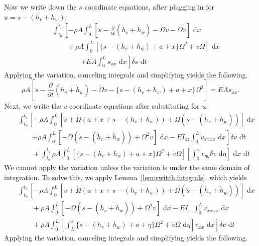 Now we write down the $s$ coordinate equations, after plugging in for $u = s-(h_v+h_w)$.
\begin{eqnarray}
& & \int_{t_0}^{t_1}\left[-\rho A\int_0^L  \left[\ddot s-\frac{\partial}{\partial t}(\dot h_v+\dot h_w)-\dot \Omega v-\Omega \dot v\right]\text{ d}x\right. \nonumber \\
& & \qquad +\rho A\int_0^L  [\lbrace s-(h_v+h_w)+a+x\rbrace\Omega^2+\dot v\Omega]\text{ d}x \\
& & \qquad \qquad \left.+EA\int_0^L s_{xx}\text{ d}x \right]\delta s\text{ d}t\nonumber
\end{eqnarray}
Applying the variation, canceling integrals and simplifying yields the following.
\begin{equation}
\rho A \left[\ddot s-\frac{\partial}{\partial t}(\dot h_v+\dot h_w)-\dot \Omega v-\lbrace s-(h_v+h_w)+a+x\rbrace\Omega^2\right] = EAs_{xx}.
\end{equation}
Next, we write the $v$ coordinate equations after substituting for $u$.
\begin{eqnarray}
& & \int_{t_0}^{t_1}\left[-\rho A \int_0^L [\ddot v + \dot \Omega (a+x+s-(h_v+h_w))+\Omega(\dot s - (\dot h_v+\dot h_w))]\text{ d}x\right.\nonumber \\ 
& & \qquad\left. +\rho A\int_0^L  [-\Omega(\dot s-(\dot h_v+\dot h_w))+\Omega^2v] \text{ d}x -EI_{zz}\int_0^L v_{xxxx}\text{ d}x\right]\delta v\text{ d}t\\
& & \qquad +\int_{t_0}^{t_1}\rho A\int_0^L [\lbrace s-(h_v+h_w)+a+x\rbrace\Omega^2+\dot v\Omega]\left[\int_0^xv_{\eta\eta}\delta v\text{ d}\eta\right]\text{ d}x\text{ d}t\nonumber
\end{eqnarray}
We cannot apply the variation unless the variation is under the same domain of integration. To solve this, we apply Lemma~\ref{lem:switch.integrals}, which yields
\begin{eqnarray}
& & \int_{t_0}^{t_1}\left[-\rho A \int_0^L [\ddot v + \dot \Omega (a+x+s-(h_v+h_w))+\Omega(\dot s - (\dot h_v+\dot h_w))]\text{ d}x\right.\nonumber \\ 
& & \qquad +\rho A\int_0^L  [-\Omega(\dot s-(\dot h_v+\dot h_w))+\Omega^2v] \text{ d}x -EI_{zz}\int_0^L v_{xxxx}\text{ d}x\\
& & \qquad +\left.\rho A\int_0^L \left[\int_L^x\lbrace s-(h_v+h_w)+a+\eta\rbrace\Omega^2+\dot v\Omega\text{ d}\eta\right] v_{xx}\text{ d}x\right]\delta v\text{ d}t\nonumber
\end{eqnarray}
Applying the variation, canceling integrals and simplifying yields the following.
